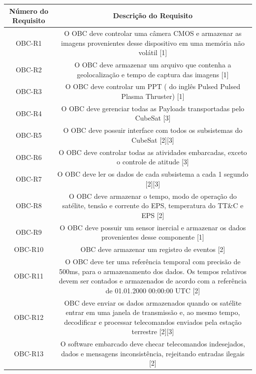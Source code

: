 \begin{apendicesenv}
\begin{table}[h]
{{{\begin{tabular}{ccc}
	\textbf{Número do Requisito}& \multicolumn{2}{c}{Descrição do Requisito}\\ \hline%
OBC-R1 &	\multicolumn{2}{p{13cm}}{\raggedright  O OBC deve controlar uma câmera CMOS e armazenar as imagens provenientes desse dispositivo em uma memória não volátil [1] }\\ \hline
OBC-R2 &	\multicolumn{2}{p{13cm}}{\raggedright O OBC deve armazenar um arquivo que contenha a geolocalização e tempo de captura das imagens [1] }\\ \hline
OBC-R3 &	\multicolumn{2}{p{13cm}}{\raggedright O OBC deve controlar um PPT ( do inglês Pulsed Pulsed Plasma Thruster) [1] }\\ \hline
OBC-R4 &	\multicolumn{2}{p{13cm}}{\raggedright O OBC deve gerenciar todas as Payloads transportadas pelo CubeSat [3] }\\ \hline
OBC-R5 &	\multicolumn{2}{p{13cm}}{\raggedright O OBC deve possuir interface com todos os subsistemas do CubeSat [2][3]}\\ \hline
OBC-R6 &	\multicolumn{2}{p{13cm}}{\raggedright O OBC deve controlar todas as atividades embarcadas, exceto o controle de atitude [3] }\\ \hline
OBC-R7 &	\multicolumn{2}{p{13cm}}{\raggedright O OBC deve ler os dados de cada subsistema a cada 1 segundo [2][3] }\\ \hline
OBC-R8 &	\multicolumn{2}{p{13cm}}{\raggedright O OBC deve armazenar o tempo, modo de operação do satélite, tensão e corrente do EPS, temperatura do TT\&C e EPS [2] }\\ \hline
OBC-R9 &	\multicolumn{2}{p{13cm}}{\raggedright O OBC deve possuir um sensor inercial e armazenar os dados provenientes desse componente [1]}\\ \hline
OBC-R10 &	\multicolumn{2}{p{13cm}}{\raggedright OBC deve armazenar um registro de eventos [2]}\\ \hline
OBC-R11 &	\multicolumn{2}{p{13cm}}{\raggedright O OBC deve ter uma referência temporal com precisão de 500ms, para o armazenamento dos dados. Os tempos relativos devem ser contados e armazenados de acordo com a referência de 01.01.2000 00:00:00 UTC [2]}\\ \hline
OBC-R12 &	\multicolumn{2}{p{13cm}}{\raggedright OBC deve enviar os dados armazenados quando os satélite entrar em  uma janela de transmissão e, ao mesmo tempo, decodificar e processar telecomandos enviados  pela estação terrestre [2][3]}\\ \hline
OBC-R13 &	\multicolumn{2}{p{13cm}}{\raggedright O software embarcado deve checar telecomandos indesejados, dados e mensagens inconsistência, rejeitando entradas ilegais [2]}\\ \hline 

\end{tabular}}}}
\end{table}
\end{apendicesenv}
